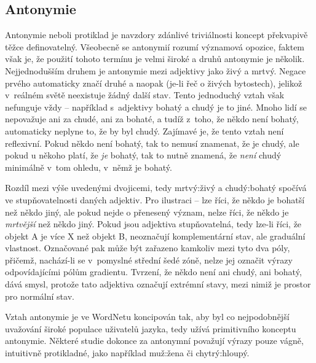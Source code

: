 \documentclass[a4paper,11pt,openany,twoside]{book}
\newcommand\ex{\textsf}
\begin{document}

				\subsection{Antonymie}

					Antonymie neboli protiklad je navzdory zdánlivé triviálnosti koncept překvapivě těžce definovatelný. Všeobecně se antonymií rozumí významová opozice, faktem však je, že použití tohoto termínu je velmi široké a druhů antonymie je několik. Nejjednodušším druhem je antonymie mezi adjektivy jako \ex{živý} a \ex{mrtvý}. Negace prvého automaticky značí druhé a naopak (je-li řeč o živých bytostech), jelikož v~reálném světě neexistuje žádný další stav. Tento jednoduchý vztah však nefunguje vždy -- například s~adjektivy \ex{bohatý} a \ex{chudý} je to jiné. Mnoho lidí se nepovažuje ani za chudé, ani za bohaté, a tudíž z~toho, že někdo není bohatý, automaticky neplyne to, že by byl chudý. \parencite{miller1990introduction} Zajímavé je, že tento vztah není reflexivní. Pokud někdo není bohatý, tak to nemusí znamenat, že je chudý, ale pokud u někoho platí, že \textit{je} bohatý, tak to nutně znamená, že \textit{není} chudý minimálně v~tom ohledu, v~němž je bohatý. \parencite{paradis2006antonymy} 

					Rozdíl mezi výše uvedenými dvojicemi, tedy \ex{mrtvý:živý} a \ex{chudý:bohatý} spočívá ve stupňovatelnosti daných adjektiv. Pro ilustraci -- lze říci, že někdo je \ex{bohatší} než někdo jiný, ale pokud nejde o přenesený význam, nelze říci, že někdo je \ex{\textit{mrtvější}} než někdo jiný. Pokud jsou adjektiva stupňovatelná, tedy lze-li říci, že objekt A je více X než objekt B, neoznačují komplementární stav, ale graduální vlastnost. Označované pak může být zařazeno kamkoliv mezi tyto dva póly, přičemž, nachází-li se v~pomyslné střední šedé zóně, nelze jej označit výrazy odpovídajícími pólům gradientu. Tvrzení, že někdo \ex{není ani chudý, ani bohatý}, dává smysl, protože tato adjektiva označují extrémní stavy, mezi nimiž je prostor pro normální stav. \parencite{paradis2006antonymy} 

					Vztah antonymie je ve WordNetu koncipován tak, aby byl co nejpodobnější uvažování široké populace uživatelů jazyka, tedy užívá primitivního konceptu antonymie. Některé studie dokonce za antonymní považují výrazy pouze vágně, intuitivně protikladné, jako například \ex{muž:žena} či \ex{chytrý:hloupý}. \parencite{lehrer1982antonymy}
\end{document}
